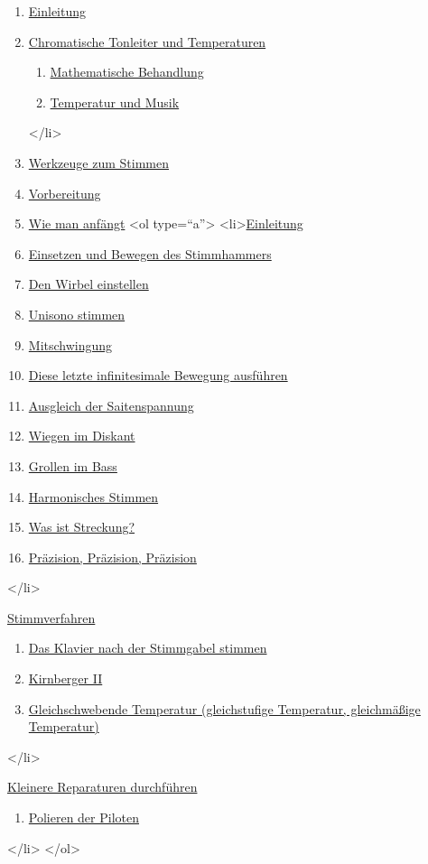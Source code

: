 \begin{enumerate} 
 \item \hyperlink{c2_1}{Einleitung}
 \item \hyperlink{c2_2}{Chromatische Tonleiter und Temperaturen}
  \begin{enumerate}[label={\alph*.}] 
   <li>\hyperlink{c2_2a}{Einleitung}
   \item \hyperlink{c2_2b}{Mathematische Behandlung}
   \item \hyperlink{c2_2c}{Temperatur und Musik}
   \end{enumerate}
 </li>
 \item \hyperlink{c2_3}{Werkzeuge zum Stimmen}
 \item \hyperlink{c2_4}{Vorbereitung}
 \item \hyperlink{c2_5}{Wie man anfängt}
  <ol type=\enquote{a}>
   <li>\hyperlink{c2_5a}{Einleitung}
   \item \hyperlink{c2_5_hamm}{Einsetzen und Bewegen des Stimmhammers}
   \item \hyperlink{c2_5_wirb}{Den Wirbel einstellen}
   \item \hyperlink{c2_5_unis}{Unisono stimmen}
   \item \hyperlink{c2_5_mits}{Mitschwingung}
   \item \hyperlink{c2_5_infi}{Diese letzte infinitesimale Bewegung ausführen}
   \item \hyperlink{c2_5_span}{Ausgleich der Saitenspannung}
   \item \hyperlink{c2_5_disk}{Wiegen im Diskant}
   \item \hyperlink{c2_5_bass}{Grollen im Bass}
   \item \hyperlink{c2_5_harm}{Harmonisches Stimmen}
   \item \hyperlink{c2_5_stre}{Was ist Streckung?}
   \item \hyperlink{c2_5_prae}{Präzision, Präzision, Präzision}
   \end{enumerate}
 </li>
 \item \hyperlink{c2_6}{Stimmverfahren}
  \begin{enumerate}[label={\alph*.}] 
   <li>\hyperlink{c2_6a}{Einleitung}
   \item \hyperlink{c2_6_gabe}{Das Klavier nach der Stimmgabel stimmen}
   \item \hyperlink{c2_6_kirn}{Kirnberger II}
   \item \hyperlink{c2_6_et}{Gleichschwebende Temperatur (gleichstufige Temperatur, gleichmäßige Temperatur)}
   \end{enumerate}
 </li>
 \item \hyperlink{c2_7}{Kleinere Reparaturen durchführen}
  \begin{enumerate}[label={\alph*.}] 
   <li>\hyperlink{c2_7_hamm}{Intonieren der Hämmer}
   \item \hyperlink{c2_7_pilo}{Polieren der Piloten}
   \end{enumerate}
 </li>
</ol> 

